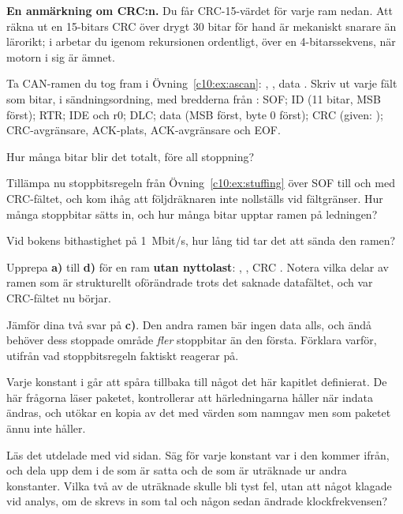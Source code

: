 \begin{aside}
\textbf{En anmärkning om CRC:n.} Du får CRC-15-värdet för varje ram nedan. Att räkna ut en 15-bitars
CRC över drygt 30 bitar för hand är mekaniskt snarare än lärorikt; i  arbetar du
igenom rekursionen ordentligt, över en 4-bitarssekvens, när motorn i sig är ämnet.
\end{aside}

 Ta CAN-ramen du tog fram i Övning~\ref{c10:ex:ascan}: , ,
data . Skriv ut varje fält som bitar, i sändningsordning, med bredderna från
: SOF; ID (11 bitar, MSB först); RTR; IDE och r0; DLC; data (MSB först,
byte 0 först); CRC (given: ); CRC-avgränsare, ACK-plats, ACK-avgränsare och
EOF.

 Hur många bitar blir det totalt, före all stoppning?

 Tillämpa nu stoppbitsregeln från Övning~\ref{c10:ex:stuffing} över SOF till och med
CRC-fältet, och kom ihåg att följdräknaren inte nollställs vid fältgränser. Hur många stoppbitar
sätts in, och hur många bitar upptar ramen på ledningen?

 Vid bokens bithastighet på 1~Mbit/s, hur lång tid tar det att sända den ramen?

 Upprepa \textbf{a)} till \textbf{d)} för en ram \textbf{utan nyttolast}:
, , CRC . Notera vilka delar av ramen som är
strukturellt oförändrade trots det saknade datafältet, och var CRC-fältet nu börjar.

 Jämför dina två svar på \textbf{c)}. Den andra ramen bär ingen data alls, och ändå behöver
dess stoppade område \emph{fler} stoppbitar än den första. Förklara varför, utifrån vad
stoppbitsregeln faktiskt reagerar på.


\label{c10:ex:package}
Varje konstant i  går att spåra tillbaka till något det här kapitlet definierat. De
här frågorna läser paketet, kontrollerar att härledningarna håller när indata ändras, och utökar en
kopia av det med värden som  namngav men som paketet ännu inte håller.

 Läs det utdelade  med  vid sidan. Säg
för varje konstant var i  den kommer ifrån, och dela upp dem i de som är
satta och de som är uträknade ur andra konstanter. Vilka två av de uträknade skulle bli tyst fel,
utan att något klagade vid analys, om de skrevs in som tal och någon sedan ändrade klockfrekvensen?

